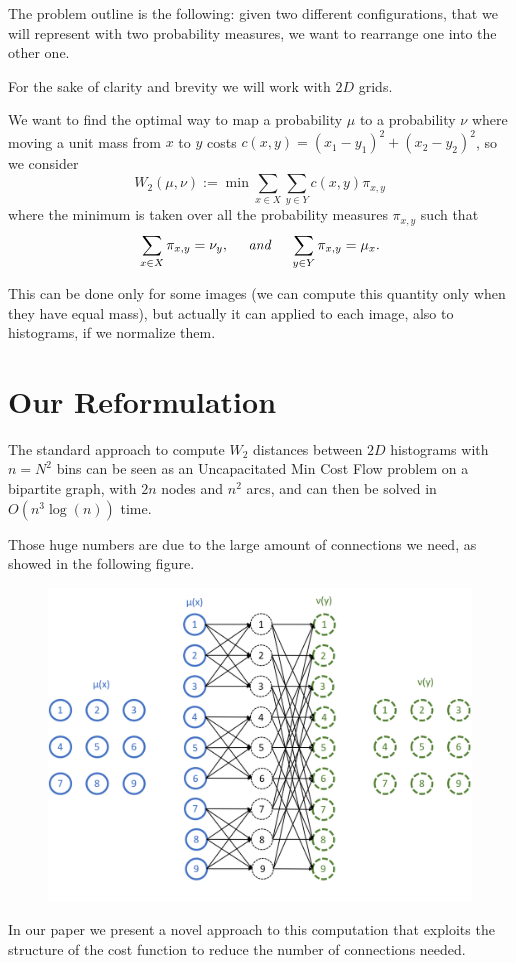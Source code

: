 \documentclass[al, 27pt, plainboxedsections, landscape]{sciposter}
\begin{document}
\begin{multicols}{3}
 The problem outline is the following: given two different configurations, that we will represent with two probability measures, we want to rearrange one into the other one. 

For the sake of clarity and brevity we will work with $2D$ grids.\newline
	
We want to find the optimal way to map a probability $\mu$ to a probability $\nu$ where moving a unit mass from $x$ to $y$ costs $c(x, y)=(x_1-y_1)^2 + (x_2-y_2)^2$, so we consider
\[
W_2(\mu,\nu) := \min \sum_{x \in X}\sum_{y\in Y}c(x,y) \pi_{x,y}
\]
where the minimum is taken over all the probability measures $\pi_{x,y}$ such that
\[
\sum_{x \in X}\pi_{x,y}=\nu_y, \;\;\;\;\; \emph{and}  \;\;\;\;\; \sum_{y \in Y}\pi_{x,y}= \mu_x.
\]

This can be done only for some images (we can compute this quantity only when they have equal mass), but actually it can applied to each image, also to histograms, if we normalize them. 


\section{Our Reformulation}
The standard approach to compute $W_2$ distances between $2D$ histograms with $n = N^2$ bins can be seen as an Uncapacitated Min Cost Flow problem on a bipartite graph, with $2n$ nodes and $n^2$ arcs, and can then be solved in $O(n^3 \log (n))$ time.\newline

Those huge numbers are due to the large amount of connections we need, as showed in the following figure.

\begin{figure}[!t]
	\centering
	\includegraphics[width=0.55\columnwidth]{images/fig6}
\end{figure}

In our paper we present a novel approach to this computation that exploits the structure of the cost function to reduce the number of connections needed.\newline


\end{multicols}
\end{document}
